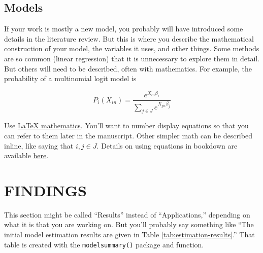 \documentclass[3p, authoryear]{elsarticle} %
\begin{document}
\hypertarget{models}{%
\subsection{Models}\label{models}}

If your work is mostly a new model, you probably will have introduced some
details in the literature review. But this is where you describe the
mathematical construction of your model, the variables it uses, and other
things. Some methods are so common (linear regression) that it is unnecessary to
explore them in detail. But others will need to be described, often with
mathematics. For example, the probability of a multinomial logit model is

\begin{equation}
  P_i(X_{in}) = \frac{e^{X_{in}\beta_i}}{\sum_{j \in J}e^{X_{jn}\beta_j}}
  \label{eq:mnl}
\end{equation}

Use \href{https://www.overleaf.com/learn/latex/mathematical_expressions}{LaTeX mathematics}.
You'll want to number display equations so that you can
refer to them later in the manuscript. Other simpler math can be described inline,
like saying that \(i, j \in J\). Details on using equations in bookdown are available
\href{https://bookdown.org/yihui/bookdown/markdown-extensions-by-bookdown.html}{here}.

\hypertarget{findings}{%
\section{FINDINGS}\label{findings}}

This section might be called ``Results'' instead of ``Applications,'' depending
on what it is that you are working on. But you'll probably say something like
``The initial model estimation results are given in Table \ref{tab:estimation-results}.''
That table is created with the \texttt{modelsummary()} package and function.
\end{document}
